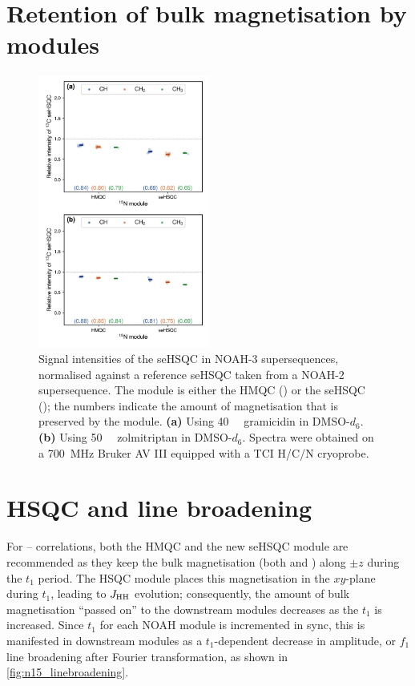 \section{Retention of bulk magnetisation by \texorpdfstring{\nitrogen{}}{15N} modules}

\begin{figure}
    \centering
    \includegraphics[width=0.5\textwidth]{./figures/n15_bulk_retention.png}
    \caption{
        Signal intensities of the \carbon{} seHSQC in NOAH-3  supersequences, normalised against a reference \carbon{} seHSQC taken from a NOAH-2  supersequence.
        The module \noahX{} is either the \nitrogen{} HMQC (\noahM{}) or the \nitrogen{} seHSQC (\noahSpn{}); the numbers indicate the amount of  magnetisation that is preserved by the \nitrogen{} module.
        \textbf{(a)} Using \SI{40}{\milli\molar} gramicidin in DMSO-$d_6$.
        \textbf{(b)} Using \SI{50}{\milli\molar} zolmitriptan in DMSO-$d_6$.
        Spectra were obtained on a \SI{700}{\MHz} Bruker AV III equipped with a TCI H/C/N cryoprobe.
    }
    \label{fig:n15_bulk_retention}
\end{figure}


\section{\texorpdfstring{\nitrogen{}}{15N} HSQC and line broadening}

For \nitrogen{}--\proton{} correlations, both the HMQC and the new seHSQC module are recommended as they keep the bulk magnetisation (both  and ) along $\pm z$ during the $t_1$ period.
The HSQC module places this magnetisation in the $xy$-plane during $t_1$, leading to $\jhh$ evolution; consequently, the amount of bulk magnetisation ``passed on'' to the downstream modules decreases as the \nitrogen{} $t_1$ is increased.
Since $t_1$ for each NOAH module is incremented in sync, this is manifested in downstream modules as a $t_1$-dependent decrease in amplitude, or $f_1$ line broadening after Fourier transformation, as shown in \cref{fig:n15_linebroadening}.

